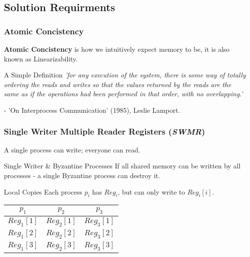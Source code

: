 \subsection{Solution Requirments}
\begin{frame}
    \frametitle{Atomic Concistency}
    \textbf{Atomic Concistency} is how we intuitively expect memory to be,
    it is also known as Linearizability.
    \begin{block}{A Simple Definition}
        \emph{'for any execution of the system, there is some way of totally ordering
        the reads and writes so that the values returned by the reads are the same
        as if the operations had been performed in that order, with no overlapping.'}\\
    \end{block}
    - 'On Interprocess Communication' (1985), Leslie Lamport.
\end{frame}
\begin{frame}
    \frametitle{Single Writer Multiple Reader Registers (\emph{SWMR})}
    A single process can write; everyone can read.\\
    \begin{block}{Single Writer \& Byzantine Processes}
        If all shared memory can be written by all processes - a single Byzantine process can destroy it.
    \end{block}
    \begin{block}{Local Copies}
    Each process $p_i$ has $Reg_i$, but can only write to \alert{$Reg_i[i]$}.
        \begin{center}
            \begin{tabular}{|c|c|c|}
                \hline
                $p_1$ & $p_2$ & $p_3$ \\
                \hline
                \alert{$Reg_1[1]$} & $Reg_2[1]$ & $Reg_3[1]$ \\  
                $Reg_1[2]$ & \alert{$Reg_2[2]$} & $Reg_3[2]$ \\  
                $Reg_1[3]$ & $Reg_2[3]$ & \alert{$Reg_3[3]$} \\
                \hline
            \end{tabular}\\
        \end{center}
    \end{block}
\end{frame}

\begin{frame}
    \frametitle{ }
\end{frame}
